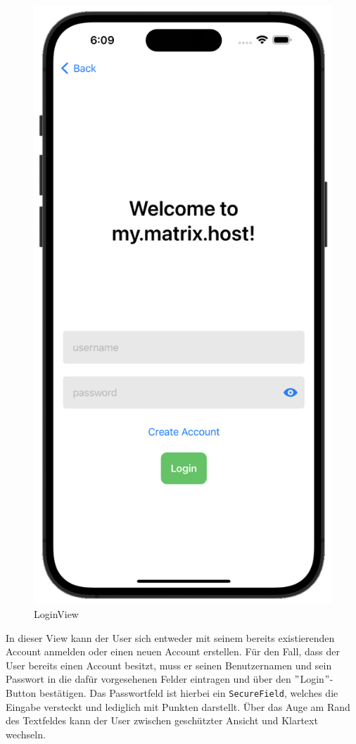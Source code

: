     \begin{figure}[h]
        \includegraphics[scale=0.5]{login_white}
        \centering
        \caption{LoginView}\label{fig:loginview}
    \end{figure}
    In dieser View kann der User sich entweder mit seinem bereits existierenden Account anmelden oder einen neuen Account erstellen.
    Für den Fall, dass der User bereits einen Account besitzt, muss er seinen Benutzernamen und sein Passwort in die dafür vorgesehenen Felder eintragen und über den \("\)Login\("\)-Button bestätigen.
    Das Passwortfeld ist hierbei ein \texttt{SecureField}, welches die Eingabe versteckt und lediglich mit Punkten darstellt.
    Über das Auge am Rand des Textfeldes kann der User zwischen geschützter Ansicht und Klartext wechseln.


